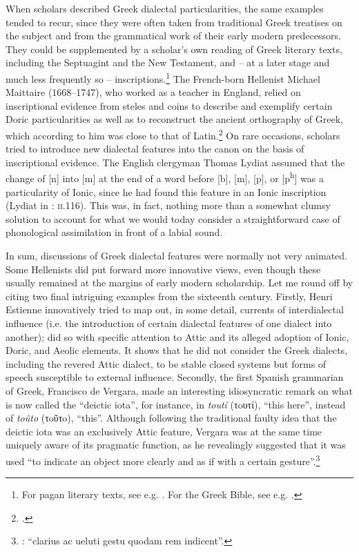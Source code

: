 When scholars described Greek dialectal particularities, the same examples tended to recur, since they were often taken from traditional Greek treatises on the subject and from the grammatical work of their early modern predecessors. They could be supplemented by a scholar’s own reading of Greek literary texts, including the Septuagint and the New Testament, and – at a later stage and much less frequently so – inscriptions.\footnote{For pagan literary texts, see e.g. \citet[]{Amerot1520, Amerot1530}. For the Greek Bible, see e.g. \citet{Pasor1632}.} The French-born Hellenist Michael Maittaire (1668–1747), who worked as a teacher in England, relied on inscriptional evidence from steles and coins to describe and exemplify certain Doric particularities as well as to reconstruct the ancient orthography of Greek, which according to him was close to that of Latin.\footnote{\citet[e.g. 161–167, 170, 184, 205–206, 211–212, 221, 240, 243]{Maittaire1706}.} On rare occasions, scholars tried to introduce new dialectal features into the canon on the basis of inscriptional evidence. The English clergyman Thomas Lydiat assumed that the change of [n] into [m] at the end of a word before [b], [m], [p], or [p\textsuperscript{h}] was a particularity of Ionic, since he had found this feature in an Ionic inscription (Lydiat in \citealt{Prideaux1676}: \textsc{ii}.116). This was, in fact, nothing more than a somewhat clumsy solution to account for what we would today consider a straightforward case of phonological assimilation in front of a labial sound.

In sum, discussions of Greek dialectal features were normally not very animated. Some Hellenists did put forward more innovative views, even though these usually remained at the margins of early modern scholarship. Let me round off by citing two final intriguing examples from the sixteenth century. Firstly, Henri Estienne innovatively tried to map out, in some detail, currents of interdialectal influence (i.e. the introduction of certain dialectal features of one dialect into another); \citet[22--28]{Estienne1581} did so with specific attention to Attic and its alleged adoption of Ionic, Doric, and Aeolic elements. It shows that he did not consider the Greek dialects, including the revered Attic dialect, to be stable closed systems but forms of speech susceptible to external influence. Secondly, the first Spanish grammarian of Greek, Francisco de Vergara, made an interesting idiosyncratic remark on what is now called the “deictic iota”, for instance, in \textit{toutí} (τoυτί), “this here”, instead of \textit{toûto} (τoῦτo), “this”. Although following the traditional faulty idea that the deictic iota was an exclusively Attic feature, Vergara was at the same time uniquely aware of its pragmatic function, as he revealingly suggested that it was used “to indicate an object more clearly and as if with a certain gesture”.\footnote{\citet[218]{Vergara1537}: “clarius ac ueluti gestu quodam rem indicent”.}


